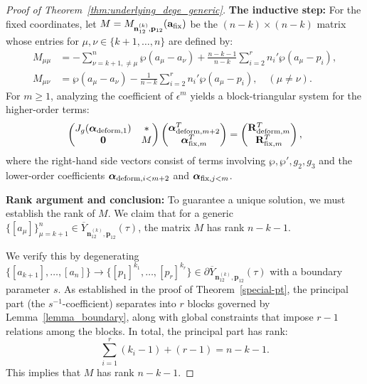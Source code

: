 \documentclass[11pt]{amsart}
\theoremstyle{remark}
\numberwithin{equation}{section}
\begin{document}
\begin{proof}[Proof of Theorem~\ref{thm:underlying_dege_generic}]
\vspace{0.5em}
\noindent\textbf{The inductive step:}
For the fixed coordinates, let $M = M_{\mathbf{n}_{12}^{(k)}, \mathbf{p}_{12}}( \mathbf{a}_{\rm fix} )$ be the $(n-k)\times (n-k)$ matrix whose entries for $\mu, \nu \in \{k+1, \dots, n\}$ are defined by:
\[
\begin{split}
     M_{\mu \mu} &= - \sum_{\nu=k+1,\neq \mu}^n \wp(a_\mu - a_\nu) + \frac{n-k-1}{n-k} \sum_{i=2}^r n_i' \wp(a_{\mu} - p_i), 
    \\
    M_{\mu \nu} &=  \wp(a_\mu - a_\nu) - \frac{1}{n-k} \sum_{i=2}^r n_i' \wp(a_{\mu} - p_i), \quad (\mu \neq \nu).
\end{split}
\]
For $m \geq 1$, analyzing the coefficient of $\epsilon^m$ yields a block-triangular system for the higher-order terms:
\begin{equation} \label{eqn:inductive_block}
    \begin{pmatrix}
        J_g( \boldsymbol{\alpha}_{{\rm deform},1} ) & * \\
        \mathbf{0} & M
    \end{pmatrix}
    \begin{pmatrix}
        \boldsymbol{\alpha}_{{\rm deform},m+2}^T \\
        \boldsymbol{\alpha}_{{\rm fix},m}^T
    \end{pmatrix} 
    =  
    \begin{pmatrix}
        \mathbf{R}_{{\rm deform}, m}^T \\
        \mathbf{R}_{{\rm fix}, m}^T
    \end{pmatrix},
\end{equation}
where the right-hand side vectors consist of terms involving $\wp, \wp', g_2, g_3$ and the lower-order coefficients $\boldsymbol{\alpha}_{{\rm deform}, i < m+2}$ and $\boldsymbol{\alpha}_{{\rm fix}, j < m}$.

\vspace{0.5em}
\noindent\textbf{Rank argument and conclusion:}
To guarantee a unique solution, we must establish the rank of $M$. We claim that for a generic $\{[a_\mu]\}_{\mu=k+1}^n \in \overline{Y}_{\mathbf{n}_{12}^{(k)},\mathbf{p}_{12}}(\tau)$, the matrix $M$ has rank $n-k-1$. 

We verify this by degenerating $\{[a_{k+1}],\dots,[a_n]\} \to \{[p_1]^{k_1},\dots,[p_r]^{k_r}\} \in \partial\overline{Y}_{\mathbf{n}_{12}^{(k)},\mathbf{p}_{12}}(\tau)$ with a boundary parameter $s$. As established in the proof of Theorem~\ref{special-pt}, the principal part (the $s^{-1}$-coefficient) separates into $r$ blocks governed by Lemma~\ref{lemma_boundary}, along with global constraints that impose $r-1$ relations among the blocks. In total, the principal part has rank:
\[
    \sum_{i=1}^r (k_i -1) + (r-1) = n-k-1.
\]
This implies that $M$ has rank $n-k-1$.


\end{proof}
\end{document}

